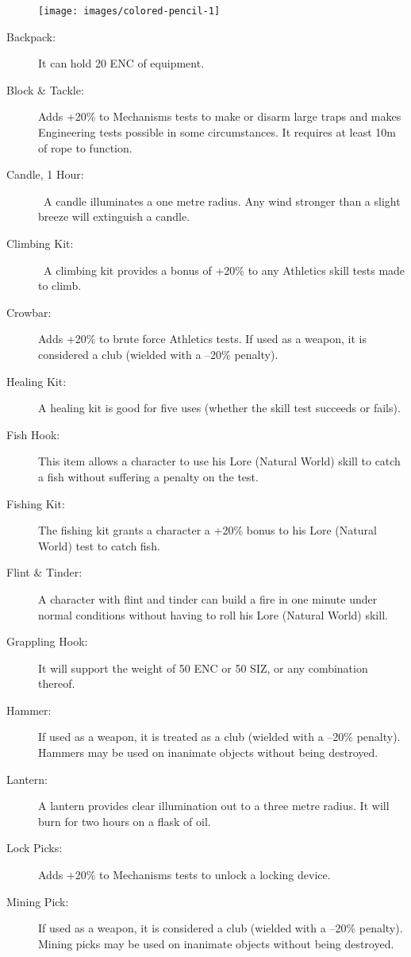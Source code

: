 \begin{figure}[h]
\begin{center}
\texttt{[image: images/colored-pencil-1]}
\end{center}
\end{figure}


\begin{description}
	\item[Backpack:] It can hold 20 ENC of equipment. 
	\item[Block \& Tackle:] Adds +20\% to Mechanisms tests to make or disarm large traps and makes Engineering tests possible in some circumstances. It requires at least 10m of rope to function. 
	\item[Candle, 1 Hour:]  A candle illuminates a one metre radius. Any wind stronger than a slight breeze will extinguish a candle. 
	\item[Climbing Kit:]  A climbing kit provides a bonus of +20\% to any Athletics skill tests made to climb. 
	\item[Crowbar:] Adds +20\% to brute force Athletics tests. If used as a weapon, it is considered a club (wielded with a –20\% penalty). 
	\item[Healing Kit:] A healing kit is good for five uses (whether the skill test succeeds or fails). 
	\item[Fish Hook:] This item allows a character to use his Lore (Natural World) skill to catch a fish without suffering a penalty on the test. 
	\item[Fishing Kit:] The fishing kit grants a character a +20\% bonus to his Lore (Natural World) test to catch fish. 
	\item[Flint \& Tinder:] A character with flint and tinder can build a fire in one minute under normal conditions without having to roll his Lore (Natural World) skill. 
	\item[Grappling Hook:] It will support the weight of 50 ENC or 50 SIZ, or any combination thereof. 
	\item[Hammer:] If used as a weapon, it is treated as a club (wielded with a –20\% penalty). Hammers may be used on inanimate objects without being destroyed. 
	\item[Lantern:] A lantern provides clear illumination out to a three metre radius. It will burn for two hours on a flask of oil. 
	\item[Lock Picks:] Adds +20\% to Mechanisms tests to unlock a locking device. 
	\item[Mining Pick:] If used as a weapon, it is considered a club (wielded with a –20\% penalty). Mining picks may be used on inanimate objects without being destroyed. 

\end{description}
